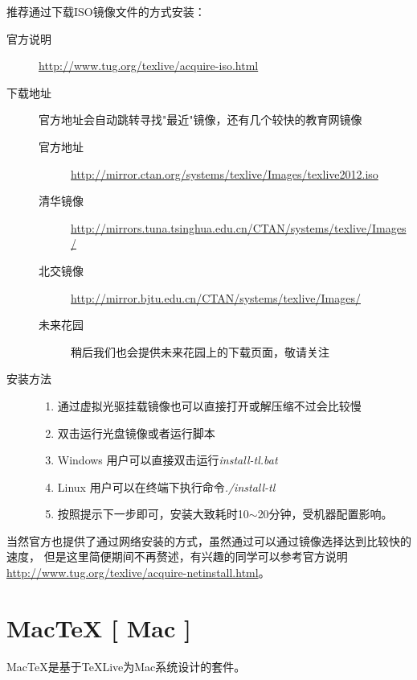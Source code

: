 推荐通过下载ISO镜像文件的方式安装：
\begin{description}
    \item[官方说明]
        \url{http://www.tug.org/texlive/acquire-iso.html}
    \item[下载地址] 官方地址会自动跳转寻找"最近"镜像，还有几个较快的教育网镜像
    \begin{description}
        \item[官方地址]
            \url{http://mirror.ctan.org/systems/texlive/Images/texlive2012.iso}
        \item[清华镜像]
            \url{http://mirrors.tuna.tsinghua.edu.cn/CTAN/systems/texlive/Images/}
        \item[北交镜像]
            \url{http://mirror.bjtu.edu.cn/CTAN/systems/texlive/Images/}
        \item[未来花园]
            稍后我们也会提供未来花园上的下载页面，敬请关注
    \end{description}
    \item[安装方法] \hfill
    \begin{enumerate}
        \item 通过虚拟光驱挂载镜像也可以直接打开或解压缩不过会比较慢
        \item 双击运行光盘镜像或者运行脚本
        \item[] Windows 用户可以直接双击运行\textsl{install-tl.bat}
        \item[] Linux 用户可以在终端下执行命令\textsl{./install-tl}
        \item 按照提示下一步即可，安装大致耗时10$\sim$20分钟，受机器配置影响。
    \end{enumerate}
\end{description}

当然官方也提供了通过网络安装的方式，虽然通过可以通过镜像选择达到比较快的速度，
但是这里简便期间不再赘述，有兴趣的同学可以参考官方说明
\url{http://www.tug.org/texlive/acquire-netinstall.html}。

\section{Mac\TeX{} [ Mac ]}

Mac\TeX{}是基于\TeX{}Live为Mac系统设计的套件。

